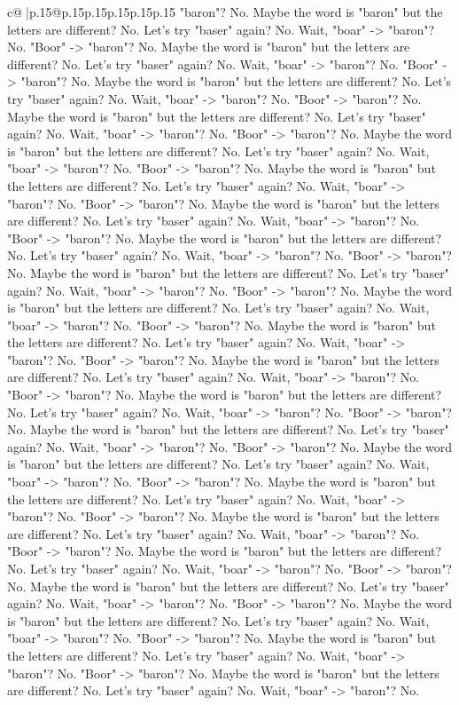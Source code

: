 \documentclass{article}
\begin{document}
{\begin{supertabular}{c@{$\;$}|p{.15\linewidth}@{}p{.15\linewidth}p{.15\linewidth}p{.15\linewidth}p{.15\linewidth}p{.15\linewidth}}
{{{"baron"? No. Maybe the word is "baron" but the letters are different? No. Let's try "baser" again? No. Wait, "boar" {-}> "baron"? No. "Boor" {-}> "baron"? No. Maybe the word is "baron" but the letters are different? No. Let's try "baser" again? No. Wait, "boar" {-}> "baron"? No. "Boor" {-}> "baron"? No. Maybe the word is "baron" but the letters are different? No. Let's try "baser" again? No. Wait, "boar" {-}> "baron"? No. "Boor" {-}> "baron"? No. Maybe the word is "baron" but the letters are different? No. Let's try "baser" again? No. Wait, "boar" {-}> "baron"? No. "Boor" {-}> "baron"? No. Maybe the word is "baron" but the letters are different? No. Let's try "baser" again? No. Wait, "boar" {-}> "baron"? No. "Boor" {-}> "baron"? No. Maybe the word is "baron" but the letters are different? No. Let's try "baser" again? No. Wait, "boar" {-}> "baron"? No. "Boor" {-}> "baron"? No. Maybe the word is "baron" but the letters are different? No. Let's try "baser" again? No. Wait, "boar" {-}> "baron"? No. "Boor" {-}> "baron"? No. Maybe the word is "baron" but the letters are different? No. Let's try "baser" again? No. Wait, "boar" {-}> "baron"? No. "Boor" {-}> "baron"? No. Maybe the word is "baron" but the letters are different? No. Let's try "baser" again? No. Wait, "boar" {-}> "baron"? No. "Boor" {-}> "baron"? No. Maybe the word is "baron" but the letters are different? No. Let's try "baser" again? No. Wait, "boar" {-}> "baron"? No. "Boor" {-}> "baron"? No. Maybe the word is "baron" but the letters are different? No. Let's try "baser" again? No. Wait, "boar" {-}> "baron"? No. "Boor" {-}> "baron"? No. Maybe the word is "baron" but the letters are different? No. Let's try "baser" again? No. Wait, "boar" {-}> "baron"? No. "Boor" {-}> "baron"? No. Maybe the word is "baron" but the letters are different? No. Let's try "baser" again? No. Wait, "boar" {-}> "baron"? No. "Boor" {-}> "baron"? No. Maybe the word is "baron" but the letters are different? No. Let's try "baser" again? No. Wait, "boar" {-}> "baron"? No. "Boor" {-}> "baron"? No. Maybe the word is "baron" but the letters are different? No. Let's try "baser" again? No. Wait, "boar" {-}> "baron"? No. "Boor" {-}> "baron"? No. Maybe the word is "baron" but the letters are different? No. Let's try "baser" again? No. Wait, "boar" {-}> "baron"? No. "Boor" {-}> "baron"? No. Maybe the word is "baron" but the letters are different? No. Let's try "baser" again? No. Wait, "boar" {-}> "baron"? No. "Boor" {-}> "baron"? No. Maybe the word is "baron" but the letters are different? No. Let's try "baser" again? No. Wait, "boar" {-}> "baron"? No. "Boor" {-}> "baron"? No. Maybe the word is "baron" but the letters are different? No. Let's try "baser" again? No. Wait, "boar" {-}> "baron"? No. "Boor" {-}> "baron"? No. Maybe the word is "baron" but the letters are different? No. Let's try "baser" again? No. Wait, "boar" {-}> "baron"? No. "Boor" {-}> "baron"? No. Maybe the word is "baron" but the letters are different? No. Let's try "baser" again? No. Wait, "boar" {-}> "baron"? No. "Boor" {-}> "baron"? No. Maybe the word is "baron" but the letters are different? No. Let's try "baser" again? No. Wait, "boar" {-}> "baron"? No. }}}
\end{supertabular}}
\end{document}
